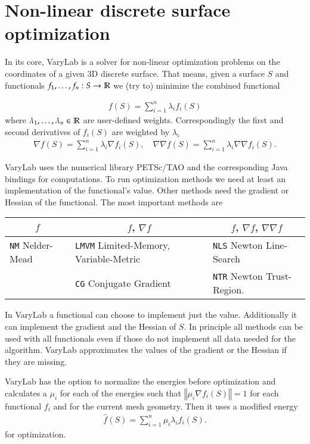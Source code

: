 \documentclass[Thesis.tex]{subfiles}
\begin{document}
\section{Non-linear discrete surface optimization}
\label{sec:general_varylab}
In its core, {\sc VaryLab} is a solver for non-linear optimization problems on the coordinates of a given 3D discrete surface. 
That means, given a surface $S$ and functionals $f_1,\ldots,f_n:S\to\mathbb R$ we (try to) minimize the combined functional

\begin{eqnarray}
	f(S) = \sum_{i=1}^n \lambda_i f_i(S) \label{eq:varylab_functional}
\end{eqnarray}
where $\lambda_1,\ldots,\lambda_n\in \mathbb R$ are user-defined weights. Correspondingly the first and second  derivatives of $f_i(S)$ are weighted by $\lambda_i$
\begin{eqnarray}
	\nabla f(S) = \sum_{i=1}^n \lambda_i \nabla f_i(S), \quad \nabla\nabla f(S) = \sum_{i=1}^n \lambda_i \nabla\nabla f_i(S). \label{eq:varylab_derivatives}
\end{eqnarray}

{\sc VaryLab} uses the numerical library {\sc PETSc}/{\sc TAO} \cite{petsc-user-ref, petsc-web-page, tao-user-ref} and the corresponding {\sc Java} bindings \cite{jpetsctao-web-page} for computations. To run optimization methods we need at least an implementation of the functional's value. Other methods need the gradient or Hessian of the functional. The most important methods are
 
\begin{tabular}{l | l | l}
\multicolumn{1}{c|}{$f$} & \multicolumn{1}{c|}{$f$, $\nabla f$} & \multicolumn{1}{c}{$f$, $\nabla f$, $\nabla\nabla f$}\\
\hline
{\tt NM} Nelder-Mead & {\tt LMVM} Limited-Memory, Variable-Metric & {\tt NLS} Newton Line-Search \\
& {\tt CG} Conjugate Gradient & {\tt NTR} Newton Trust-Region.
\end{tabular}

In {\sc VaryLab} a functional can choose to implement just the value. Additionally it can implement the gradient and the Hessian of $S$. In principle all methods can be used with all functionals even if those do not implement all data needed for the algorithm. {\sc VaryLab} approximates the values of the gradient or the Hessian if they are missing.

{\sc VaryLab} has the option to normalize the energies before optimization and calculates a $\mu_i$ for each of the energies such that 	$\left\Vert\mu_i\nabla f_i(S)\right\Vert = 1$ for each functional $f_i$ and for the current mesh geometry. Then it uses a modified energy
\begin{eqnarray}
	\hat{\mathit f}(S) = \sum_{i=1}^n \mu_i\lambda_i f_i(S). \label{eq:varylab_normalized_functional}
\end{eqnarray}
for optimization.
\end{document}
